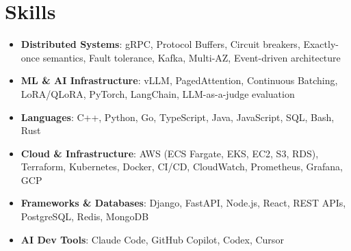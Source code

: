 \documentclass[letterpaper,11pt]{article}
\newcommand{\resumeSubHeadingListStart}{\begin{itemize}[leftmargin=0.15in, label={}]}
\newcommand{\resumeSubHeadingListEnd}{\end{itemize}}
\newcommand{\resumeSkillHeading}[2]{%
  \item\small{\textbf{#1}: #2 \vspace{-9pt}}%
}
\begin{document}
\section{Skills}
  \resumeSubHeadingListStart
    \resumeSkillHeading{Distributed Systems}{gRPC, Protocol Buffers, Circuit breakers, Exactly-once semantics, Fault tolerance, Kafka, Multi-AZ, Event-driven architecture}
    \resumeSkillHeading{ML \& AI Infrastructure}{vLLM, PagedAttention, Continuous Batching, LoRA/QLoRA, PyTorch, LangChain, LLM-as-a-judge evaluation}
    \resumeSkillHeading{Languages}{C++, Python, Go, TypeScript, Java, JavaScript, SQL, Bash, Rust}
    \resumeSkillHeading{Cloud \& Infrastructure}{AWS (ECS Fargate, EKS, EC2, S3, RDS), Terraform, Kubernetes, Docker, CI/CD, CloudWatch, Prometheus, Grafana, GCP}
    \resumeSkillHeading{Frameworks \& Databases}{Django, FastAPI, Node.js, React, REST APIs, PostgreSQL, Redis, MongoDB}
    \resumeSkillHeading{AI Dev Tools}{Claude Code, GitHub Copilot, Codex, Cursor}
  \resumeSubHeadingListEnd
\end{document}
